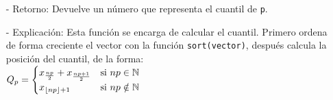 \documentclass[a4paper, 12pt]{article}
\begin{document}
\begin{itemize}
\begin{itemize}
			\item[-] Retorno: Devuelve un número que representa el cuantil de \texttt{p}. 
			
			\item[-] Explicación: Esta función se encarga de calcular el cuantil. Primero ordena de forma creciente el vector con la función \texttt{sort(vector)}, después calcula la posición del cuantil, de la forma: \\
			$\text{\texttt{{$Q_{p}$}}} = \begin{cases} 
				x_{\frac{np}{2}}+x_{\frac{np+1}{2}} & \text{si } np \in \mathbb{N} \\
				x_{\lfloor{np}\rfloor +1} & \text{si } np \notin \mathbb{N}
			\end{cases}$
		\end{itemize}
	\end{itemize}
	
\end{document}
